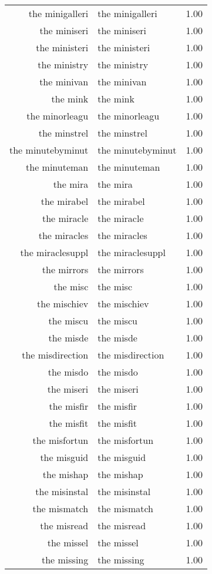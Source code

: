 \begin{table}[ht]
\begin{tabular}{rlr}
  the minigalleri & the minigalleri & 1.00 \\ 
  the miniseri & the miniseri & 1.00 \\ 
  the ministeri & the ministeri & 1.00 \\ 
  the ministry & the ministry & 1.00 \\ 
  the minivan & the minivan & 1.00 \\ 
  the mink & the mink & 1.00 \\ 
  the minorleagu & the minorleagu & 1.00 \\ 
  the minstrel & the minstrel & 1.00 \\ 
  the minutebyminut & the minutebyminut & 1.00 \\ 
  the minuteman & the minuteman & 1.00 \\ 
  the mira & the mira & 1.00 \\ 
  the mirabel & the mirabel & 1.00 \\ 
  the miracle & the miracle & 1.00 \\ 
  the miracles & the miracles & 1.00 \\ 
  the miraclesuppl & the miraclesuppl & 1.00 \\ 
  the mirrors & the mirrors & 1.00 \\ 
  the misc & the misc & 1.00 \\ 
  the mischiev & the mischiev & 1.00 \\ 
  the miscu & the miscu & 1.00 \\ 
  the misde & the misde & 1.00 \\ 
  the misdirection & the misdirection & 1.00 \\ 
  the misdo & the misdo & 1.00 \\ 
  the miseri & the miseri & 1.00 \\ 
  the misfir & the misfir & 1.00 \\ 
  the misfit & the misfit & 1.00 \\ 
  the misfortun & the misfortun & 1.00 \\ 
  the misguid & the misguid & 1.00 \\ 
  the mishap & the mishap & 1.00 \\ 
  the misinstal & the misinstal & 1.00 \\ 
  the mismatch & the mismatch & 1.00 \\ 
  the misread & the misread & 1.00 \\ 
  the missel & the missel & 1.00 \\ 
  the missing & the missing & 1.00 \\ 

\end{tabular}
\end{table}
